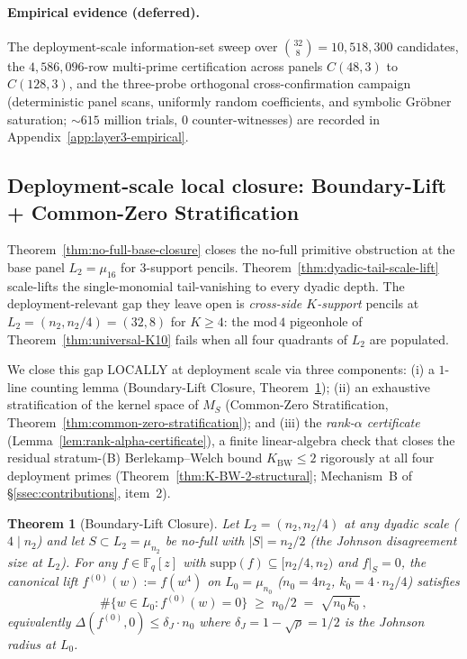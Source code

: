 \documentclass[11pt]{article}
\newtheorem{theorem}{Theorem}[section]
\theoremstyle{definition}
\theoremstyle{remark}
\newcommand{\FF}{\mathbb{F}}
\begin{document}
\paragraph{Empirical evidence (deferred).}
The deployment-scale information-set sweep over $\binom{32}{8} = 10{,}518{,}300$
candidates, the $4{,}586{,}096$-row multi-prime certification across panels
$C(48,3)$ to $C(128,3)$, and the three-probe orthogonal cross-confirmation
campaign (deterministic panel scans, uniformly random coefficients, and
symbolic Gr\"obner saturation; ${\sim}615$ million trials, $0$
counter-witnesses) are recorded in
Appendix~\ref{app:layer3-empirical}.


\subsection{Deployment-scale local closure: Boundary-Lift + Common-Zero Stratification}
\label{ssec:deployment-local-closure}

\noindent Theorem~\ref{thm:no-full-base-closure} closes the no-full primitive
obstruction at the base panel $L_2 = \mu_{16}$ for $3$-support pencils.
Theorem~\ref{thm:dyadic-tail-scale-lift} scale-lifts the single-monomial
tail-vanishing to every dyadic depth. The deployment-relevant gap they leave
open is \emph{cross-side $K$-support} pencils at $L_2 = (n_2, n_2/4) = (32, 8)$
for $K \geq 4$: the $\mathrm{mod}\,4$ pigeonhole of
Theorem~\ref{thm:universal-K10} fails when all four quadrants of
$L_2$ are populated.

We close this gap LOCALLY at deployment scale via three components:
(i) a $1$-line counting lemma (Boundary-Lift Closure,
Theorem~\ref{thm:boundary-lift-closure}); (ii) an exhaustive
stratification of the kernel space of $M_S$ (Common-Zero Stratification,
Theorem~\ref{thm:common-zero-stratification}); and (iii) the
\emph{rank-$\alpha$ certificate} (Lemma~\ref{lem:rank-alpha-certificate}),
a finite linear-algebra check that closes the residual stratum-(B)
Berlekamp--Welch bound $K_{\mathrm{BW}} \leq 2$ rigorously at all four
deployment primes (Theorem~\ref{thm:K-BW-2-structural}; Mechanism~B
of \S\ref{ssec:contributions}, item~2).

\begin{theorem}[Boundary-Lift Closure]
\label{thm:boundary-lift-closure}
Let $L_2 = (n_2, n_2/4)$ at any dyadic scale ($4 \mid n_2$) and let
$S \subset L_2 = \mu_{n_2}$ be no-full with $|S| = n_2/2$ (the Johnson
disagreement size at $L_2$). For any $f \in \FF_q[z]$ with
$\mathrm{supp}(f) \subseteq [n_2/4, n_2)$ and $f|_S = 0$, the canonical
lift $f^{(0)}(w) := f(w^4)$ on $L_0 = \mu_{n_0}$ ($n_0 = 4 n_2$,
$k_0 = 4 \cdot n_2/4$) satisfies
\[
\#\{w \in L_0 : f^{(0)}(w) = 0\} \;\geq\; n_0/2 \;=\; \sqrt{n_0 \, k_0}\,,
\]
equivalently $\Delta(f^{(0)}, 0) \leq \delta_J \cdot n_0$ where
$\delta_J = 1 - \sqrt{\rho} = 1/2$ is the Johnson radius at $L_0$.
\end{theorem}
\end{document}
